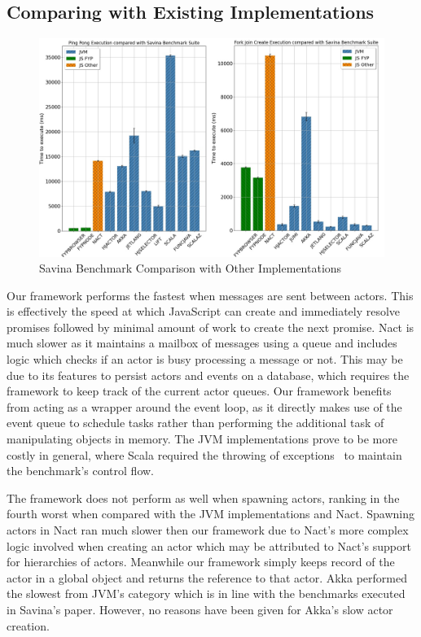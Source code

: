 \documentclass[oneside]{um-fict}
\begin{document}
\subsection{Comparing with Existing Implementations}
\begin{figure}[H]
    \begin{centering}
        \includegraphics[width=\textwidth]{resources/savina.png}
        \caption{Savina Benchmark Comparison with Other Implementations}
    \end{centering}
\end{figure}
Our framework performs the fastest when messages are sent between actors. This is effectively the speed at which JavaScript can create and immediately resolve promises followed by minimal amount of work to create the next promise. Nact is much slower as it maintains a mailbox of messages using a queue and includes logic which checks if an actor is busy processing a message or not. This may be due to its features to persist actors and events on a database, which requires the framework to keep track of the current actor queues. Our framework benefits from acting as a wrapper around the event loop, as it directly makes use of the event queue to schedule tasks rather than performing the additional task of manipulating objects in memory. The JVM implementations prove to be more costly in general, where Scala required the throwing of exceptions~\cite{savina} to maintain the benchmark's control flow.

The framework does not perform as well when spawning actors, ranking in the fourth worst when compared with the JVM implementations and Nact.  Spawning actors in Nact ran much slower then our framework due to Nact's more complex logic involved when creating an actor which may be attributed to Nact's support for hierarchies of actors. Meanwhile our framework simply keeps record of the actor in a global object and returns the reference to that actor. Akka performed the slowest from JVM's category which is in line with the benchmarks executed in Savina's paper.  However, no reasons have been given for Akka's slow actor creation.
\end{document}
